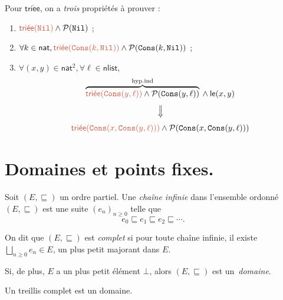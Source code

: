 \documentclass[../main]{subfiles}
\begin{document}
  \begin{exm}\label{exm:rel-triee-indu-astuce}
    Pour $\mathsf{tri\acute{e}e}$, on a \textit{trois} propriétés à prouver :
    \begin{enumerate}
      \item ${\color{nicered} \mathsf{tri\acute{e}e}(\mathtt{Nil})} \land \mathcal{P}(\mathtt{Nil})$ ;
      \item $\forall k \in \mathsf{nat}, {\color{nicered} \mathsf{tri\acute{e}e}(\mathtt{Cons}(k,\mathtt{Nil}))} \land \mathcal{P}(\mathtt{Cons}(k, \mathtt{Nil}))$ ;
      \item $\forall (x,y) \in \mathsf{nat}^2, \forall \ell \in \mathsf{nlist}$,
        \begin{gather*}
          \overbrace{{\color{nicered} \mathsf{tri\acute{e}e}(\mathtt{Cons}(y,\ell))}\land\mathcal{P}(\mathtt{Cons}(y,\ell))}^\text{hyp.ind}\: \land\: \mathsf{le}(x,y)\\
          \vertical\implies\\
          {\color{nicered}\mathsf{tri\acute{e}e}(\mathtt{Cons}(x,\mathtt{Cons}(y,\ell)))} \land \mathcal{P}(\mathtt{Cons}(x,\mathtt{Cons}(y,\ell)))
        \end{gather*}
    \end{enumerate}
  \end{exm}


  \section{Domaines et points fixes.}

  \begin{defn}
    Soit $(E, \sqsubseteq)$ un ordre partiel.
    Une \textit{chaîne infinie} dans l'ensemble ordonné $(E, \sqsubseteq)$ est une suite $(e_n)_{n \ge 0}$ telle que 
    \[
    e_0 \sqsubseteq e_1 \sqsubseteq e_2 \sqsubseteq \cdots 
    .\]

    On dit que $(E, \sqsubseteq)$  est \textit{complet} si pour toute chaîne infinie, il existe~$\bigsqcup_{n \ge 0} e_n \in E$, un plus petit majorant dans $E$.

    Si, de plus, $E$ a un plus petit élément $\bot$, alors $(E, \sqsubseteq)$ est un~\textit{domaine}.
  \end{defn}

  \begin{rmk}
    Un treillis complet est un domaine.
  \end{rmk}
\end{document}
